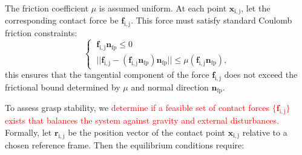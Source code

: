 \documentclass[journal]{IEEEtran}
\newcommand{\rev}[1]{\textcolor{red}{#1}}
\begin{document}
The friction coefficient $\mu$ is assumed uniform. At each point $\mathbf{x}_\mathrm{i,j}$,  let the corresponding contact force be $\mathbf{f}_\mathrm{i,j}$. This force must satisfy standard Coulomb friction constraints:
\begin{equation}
\begin{cases}
    ~\mathbf{f}_\mathrm{i,j}\mathbf{n}_\mathrm{fp} \leq 0 \\
    ~||\mathbf{f}_\mathrm{i,j}-(\mathbf{f}_\mathrm{i,j}\mathbf{n}_\mathrm{fp})\mathbf{n}_\mathrm{fp}|| \leq \mu(\mathbf{f}_\mathrm{i,j}\mathbf{n}_\mathrm{fp}),
\end{cases}
\end{equation}
this ensures that the tangential component of the force $\mathbf{f}_\mathrm{i,j}$ does not exceed the frictional bound determined by $\mu$ and normal direction $\mathbf{n}_\mathrm{fp}$. 

To assess grasp stability, we \rev{determine if a feasible set of contact forces $\{\mathbf{f}_\mathrm{i,j}\}$ exists that balances the system against gravity and external disturbances.}  Formally, let $\mathbf{r}_\mathrm{i,j}$ be the position vector of the contact point $\mathbf{x}_\mathrm{i,j}$ relative to a chosen reference frame. Then the equilibrium conditions require:
\end{document}
